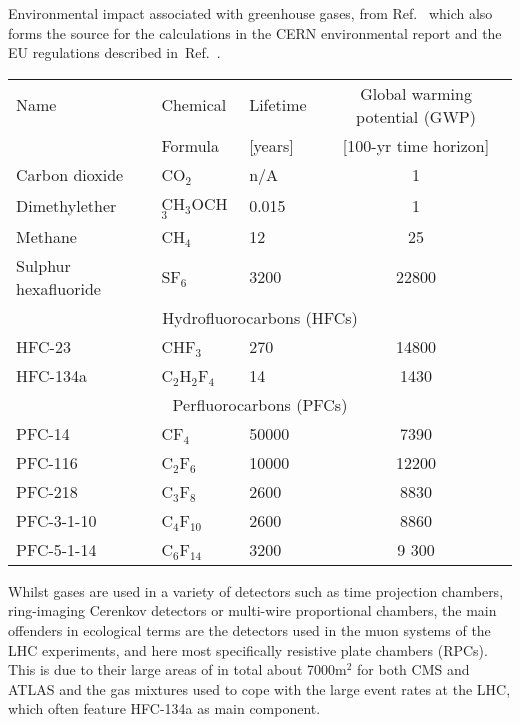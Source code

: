 \documentclass[../SustainableHEP.tex]{subfiles}
\begin{document}
{\centering
{}
\captionsetup{type=table}
\caption[Warming potential of selected greenhouse gases]{Environmental impact associated with greenhouse gases, from Ref.~\cite{IPCC17technical} which also forms the source for the calculations in the CERN environmental report and the EU regulations described in~Ref.~\cite{EUFgasregulation}.}\label{tab:GasImpact}
\begin{tabular}{@{}lllc@{}}\toprule
Name& Chemical\,\,\; & 
Lifetime\,\,

& Global warming potential (GWP) \\ 
&  Formula& 

[years]
& [100-yr time horizon]\\ 
\midrule
Carbon dioxide &	CO$_2$ & n/A & 1 \\
Dimethylether& CH$_3$OCH$_3$ & 0.015 & 1 \\ 
Methane & CH$_4$& 12& 25\\
Sulphur hexafluoride& SF$_6$ & 3200 & 22800\\
\midrule
\multicolumn{4}{c}{Hydrofluorocarbons (HFCs)}\\
\midrule
HFC-23 & CHF$_3$ &  270 & 14800\\
HFC-134a & C$_2$H$_2$F$_4$ & 14 & 1430\\
\midrule
\multicolumn{4}{c}{Perfluorocarbons (PFCs)}\\
\midrule
PFC-14 & CF$_4$ & 50000 & 7390 \\
PFC-116& C$_2$F$_6$ & 10000  & 12200\\
PFC-218&C$_3$F$_8$ & 2600 & 8830 \\
PFC-3-1-10 &C$_4$F$_{10}$ & 2600 &8860\\
PFC-5-1-14 &C$_6$F$_{14}$ & 3200 & 9 300\\
\bottomrule
\end{tabular}}

Whilst gases are used in a variety of detectors such as time projection chambers, ring-imaging Cerenkov detectors or multi-wire proportional chambers, the main offenders in ecological terms are the detectors used in the muon systems of the LHC experiments, and here most specifically resistive plate chambers (RPCs). This is due to their large areas of in total about 7000m$^2$ for both CMS and ATLAS and the gas mixtures used to cope with the large event rates at the LHC, which often feature HFC-134a as main component. 
\end{document}
